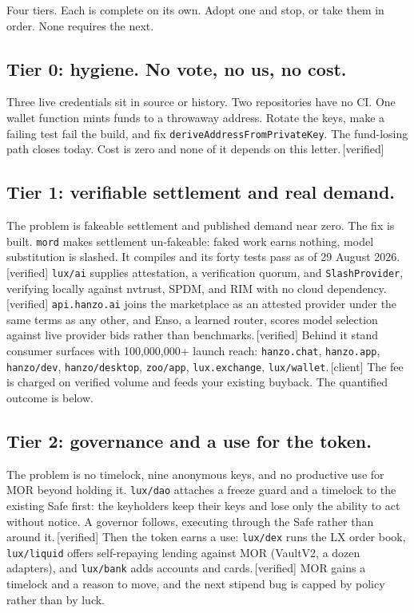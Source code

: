 \documentclass[11pt,a4paper]{article}
\newcommand{\code}[1]{\texttt{\small #1}}
\newcommand{\lab}[1]{{\color{muted}\footnotesize\,[#1]}}
\begin{document}
Four tiers. Each is complete on its own. Adopt one and stop, or take them in
order. None requires the next.

\subsection*{Tier 0: hygiene. No vote, no us, no cost.}

Three live credentials sit in source or history. Two repositories have no CI.
One wallet function mints funds to a throwaway address. Rotate the keys, make a
failing test fail the build, and fix \code{deriveAddressFromPrivateKey}. The
fund-losing path closes today. Cost is zero and none of it depends on this
letter.\lab{verified}

\subsection*{Tier 1: verifiable settlement and real demand.}

The problem is fakeable settlement and published demand near zero. The fix is
built. \code{mord} makes settlement un-fakeable: faked work earns nothing, model
substitution is slashed. It compiles and its forty tests pass as of 29 August
2026.\lab{verified} \code{lux/ai} supplies attestation, a verification quorum, and
\code{SlashProvider}, verifying locally against nvtrust, SPDM, and RIM with no
cloud dependency.\lab{verified} \code{api.hanzo.ai} joins the marketplace as an
attested provider under the same terms as any other, and Enso, a learned router,
scores model selection against live provider bids rather than benchmarks.\lab{verified}
Behind it stand consumer surfaces with 100{,}000{,}000+ launch reach:
\code{hanzo.chat}, \code{hanzo.app}, \code{hanzo/dev}, \code{hanzo/desktop},
\code{zoo/app}, \code{lux.exchange}, \code{lux/wallet}.\lab{client} The fee is
charged on verified volume and feeds your existing buyback. The quantified outcome
is below.

\subsection*{Tier 2: governance and a use for the token.}

The problem is no timelock, nine anonymous keys, and no productive use for MOR
beyond holding it. \code{lux/dao} attaches a freeze guard and a timelock to the
existing Safe first: the keyholders keep their keys and lose only the ability to
act without notice. A governor follows, executing through the Safe rather than
around it.\lab{verified} Then the token earns a use: \code{lux/dex} runs the LX
order book, \code{lux/liquid} offers self-repaying lending against MOR (VaultV2,
a dozen adapters), and \code{lux/bank} adds accounts and cards.\lab{verified} MOR
gains a timelock and a reason to move, and the next stipend bug is capped by
policy rather than by luck.
\end{document}
